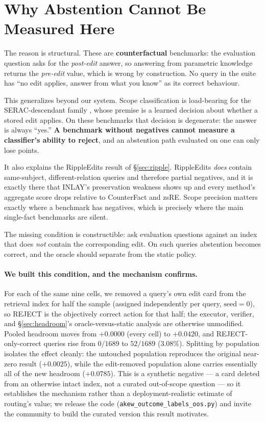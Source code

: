 \documentclass[11pt]{article}
\begin{document}
\section{Why Abstention Cannot Be Measured Here}
\label{sec:cannot-measure}

The reason is structural. These are \textbf{counterfactual} benchmarks: the
evaluation question asks for the \emph{post-edit} answer, so answering from
parametric knowledge returns the \emph{pre-edit} value, which is wrong by
construction. No query in the suite has ``no edit applies, answer from what
you know'' as its correct behaviour.

This generalizes beyond our system. Scope classification is load-bearing for
the SERAC-descendant family \citep{mitchell2022serac}, whose premise is a
learned decision about whether a stored edit applies. On these benchmarks
that decision is degenerate: the answer is always ``yes.'' \textbf{A
benchmark without negatives cannot measure a classifier's ability to
reject}, and an abstention path evaluated on one can only lose points.

It also explains the RippleEdits result of \S\ref{sec:ripple}. RippleEdits
\emph{does} contain same-subject, different-relation queries and therefore
partial negatives, and it is exactly there that INLAY's preservation weakness
shows up and every method's aggregate score drops relative to CounterFact and
zsRE. Scope precision matters exactly where a benchmark has negatives, which
is precisely where the main single-fact benchmarks are silent.

The missing condition is constructible: ask evaluation questions against an
index that does \emph{not} contain the corresponding edit. On such queries
abstention becomes correct, and the oracle should separate from the static
policy.

\paragraph{We built this condition, and the mechanism confirms.} For each of
the same nine cells, we removed a query's own edit card from the retrieval
index for half the sample (assigned independently per query, $\text{seed}=0$),
so REJECT is the objectively correct action for that half; the executor,
verifier, and \S\ref{sec:headroom}'s oracle-versus-static analysis are
otherwise unmodified. Pooled headroom moves from $+0.0000$ (every cell) to
$\mathbf{+0.0420}$, and REJECT-only-correct queries rise from $0/1689$ to
$52/1689$ ($3.08\%$). Splitting by population isolates the effect cleanly:
the untouched population reproduces the original near-zero result
($+0.0025$), while the edit-removed population alone carries essentially all
of the new headroom ($+0.0785$). This is a synthetic negative --- a card
deleted from an otherwise intact index, not a curated out-of-scope question
--- so it establishes the mechanism rather than a deployment-realistic
estimate of routing's value; we release the code
(\texttt{akew\_outcome\_labels\_oos.py}) and invite the community to build the
curated version this result motivates.
\end{document}
